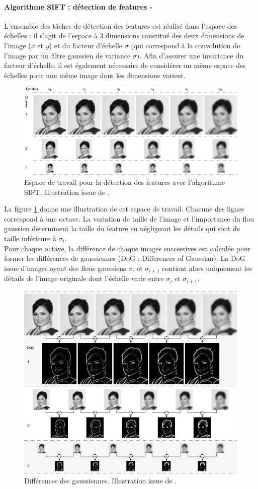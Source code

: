 \documentclass[a4paper, 11pt]{article}
\begin{document}
		\paragraph{Algorithme SIFT : détection de features -}
		L'ensemble des tâches de détection des features est réalisé dans l'espace des échelles : il s'agit de l'espace à 3 dimensions constitué des deux dimensions de l'image ($x$ et $y$) et du facteur d'échelle $\sigma$ (qui correspond à la convolution de l'image par un filtre gaussien de variance $\sigma$). Afin d'assurer une invariance du facteur d'échelle, il est également nécessaire de considérer un même espace des échelles pour une même image dont les dimensions varient.	
		\begin{figure}\centering
			\includegraphics[width=.8\textwidth]{SIFT-scale.png}
			\caption{\label{fig:sift-scale}Espace de travail pour la détection des features avec l'algorithme SIFT. Illustration issue de \cite{frwiki:177813849}.}
		\end{figure}
		La figure \ref{fig:sift-scale} donne une illustration de cet espace de travail. Chacune des lignes correspond à une octave. La variation de taille de l'image et l'importance du flou gaussien déterminent la taille du feature en négligeant les détails qui sont de taille inférieure à $\sigma_i$.
		\\Pour chaque octave, la différence de chaque images successives est calculée pour former les différences de gaussiennes (DoG : Differences of Gaussian). La DoG issue d'images ayant des flous gaussiens $\sigma_i$ et $\sigma_{i+1}$ contient alors uniquement les détails de l'image originale dont l'échelle varie entre $\sigma_i$ et $\sigma_{i+1}$.
		\begin{figure}\centering
			\includegraphics[width=.8\textwidth]{SIFT-DoG.png}
			\caption{\label{fig:sift-dog}Différences des gaussiennes. Illustration issue de \cite{frwiki:177813849}.}
		\end{figure}
\end{document}
